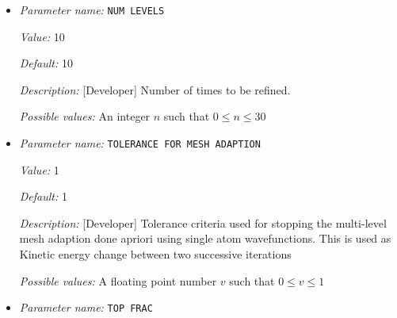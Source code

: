 \begin{itemize}
{\it Value:} 0.0


{\it Default:} 0.0


{\it Description:} [Advanced] Mesh size of the finite elements in the immediate vicinity of the atom. For the default value of 0.0, a heuristically determined MESH SIZE AT ATOM is used for all-electron calculations. For pseudopotential calculations, the default value of 0.0, sets the MESH SIZE AT ATOM to be the same value as MESH SIZE AROUND ATOM. Standard users do not need to tune this parameter. Units: a.u.


{\it Possible values:} A floating point number $v$ such that $0 \leq v \leq 10$
\item {\it Parameter name:} {\tt NUM LEVELS}
\label{parameters:Finite element mesh parameters/Auto mesh generation parameters/NUM LEVELS}
\label{parameters:Finite_20element_20mesh_20parameters/Auto_20mesh_20generation_20parameters/NUM_20LEVELS}


{\it Value:} 10


{\it Default:} 10


{\it Description:} [Developer] Number of times to be refined.


{\it Possible values:} An integer $n$ such that $0\leq n \leq 30$
\item {\it Parameter name:} {\tt TOLERANCE FOR MESH ADAPTION}
\label{parameters:Finite element mesh parameters/Auto mesh generation parameters/TOLERANCE FOR MESH ADAPTION}
\label{parameters:Finite_20element_20mesh_20parameters/Auto_20mesh_20generation_20parameters/TOLERANCE_20FOR_20MESH_20ADAPTION}


{\it Value:} 1


{\it Default:} 1


{\it Description:} [Developer] Tolerance criteria used for stopping the multi-level mesh adaption done apriori using single atom wavefunctions. This is used as Kinetic energy change between two successive iterations


{\it Possible values:} A floating point number $v$ such that $0 \leq v \leq 1$
\item {\it Parameter name:} {\tt TOP FRAC}
\label{parameters:Finite element mesh parameters/Auto mesh generation parameters/TOP FRAC}
\label{parameters:Finite_20element_20mesh_20parameters/Auto_20mesh_20generation_20parameters/TOP_20FRAC}



\end{itemize}
